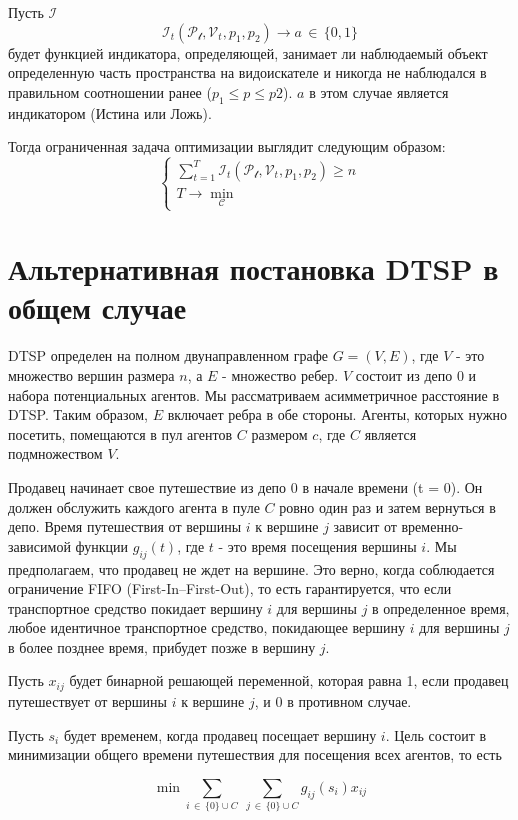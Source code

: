 Пусть $\mathcal{I}$ 
$$
\mathcal{I}_{t}(\mathcal{P_{t}}, \mathcal{V}_{t}, p_{1}, p_{2}) \to a \, \in \, \{ 0,1 \}
$$
будет функцией индикатора, определяющей, занимает ли наблюдаемый объект определенную часть пространства на видоискателе и никогда не наблюдался в правильном соотношении ранее ($p_{1} \leq p \leq p2$). $a$ в этом случае является индикатором (Истина или Ложь).

Тогда ограниченная задача оптимизации выглядит следующим образом:
$$
\begin{cases}
\sum\limits_{t=1}^{T} \mathcal{I}_{t}(\mathcal{P_{t}}, \mathcal{V}_{t}, p_{1}, p_{2}) \geq n \\
T \to \min\limits_{\mathcal{C}}
\end{cases}
$$

\section{Альтернативная постановка DTSP в общем случае}
DTSP определен на полном двунаправленном графе $ G = (V, E) $, где $ V $ - это множество вершин размера $ n $, а $ E $ - множество ребер. $ V $ состоит из депо 0 и набора потенциальных агентов. Мы рассматриваем асимметричное расстояние в DTSP. Таким образом, $ E $ включает ребра в обе стороны. Агенты, которых нужно посетить, помещаются в пул агентов $ C $ размером $ c $, где $ C $ является подмножеством $ V $.

Продавец начинает свое путешествие из депо 0 в начале времени (t = 0). Он должен обслужить каждого агента в пуле $ C $ ровно один раз и затем вернуться в депо. Время путешествия от вершины $ i $ к вершине $ j $ зависит от временно-зависимой функции $ g_{ij} (t) $, где $ t $ - это время посещения вершины $ i $. Мы предполагаем, что продавец не ждет на вершине. Это верно, когда соблюдается ограничение FIFO (First-In–First-Out), то есть гарантируется, что если транспортное средство покидает вершину $ i $ для вершины $ j $ в определенное время, любое идентичное транспортное средство, покидающее вершину $ i $ для вершины $ j $ в более позднее время, прибудет позже в вершину $ j $.

Пусть $ x_{ij} $ будет бинарной решающей переменной, которая равна 1, если продавец путешествует от вершины $ i $ к вершине $ j $, и 0 в противном случае.

Пусть $ s_i $ будет временем, когда продавец посещает вершину $ i $. Цель состоит в минимизации общего времени путешествия для посещения всех агентов, то есть

$$
\min_{}\sum_{i \, \in \, \{ 0 \}\cup C}\;\sum_{j \, \in \, \{ 0 \}\cup C} g_{ij}(s_{i})x_{ij}
$$

